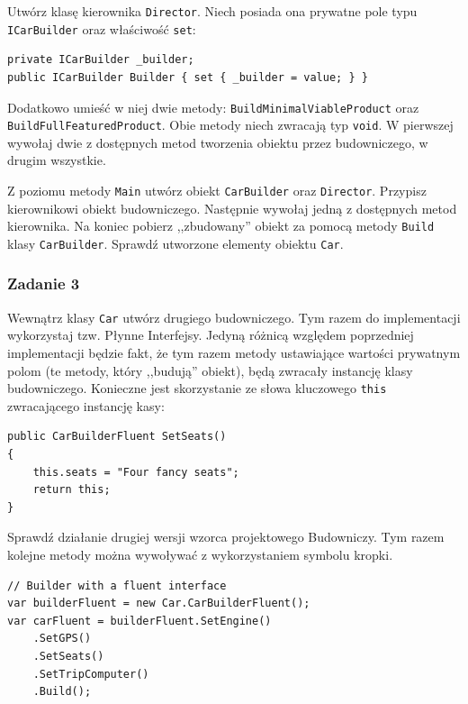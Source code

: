 Utwórz klasę kierownika \texttt{Director}. Niech posiada ona prywatne pole typu \texttt{ICarBuilder} oraz właściwość \texttt{set}:
\begin{lstlisting}
private ICarBuilder _builder;
public ICarBuilder Builder { set { _builder = value; } }
\end{lstlisting}
Dodatkowo umieść w niej dwie metody: \texttt{BuildMinimalViableProduct} oraz \texttt{BuildFullFeaturedProduct}. Obie metody niech zwracają typ \texttt{void}. W pierwszej wywołaj dwie z dostępnych metod tworzenia obiektu przez budowniczego, w drugim wszystkie.

Z poziomu metody \texttt{Main} utwórz obiekt \texttt{CarBuilder} oraz \texttt{Director}. Przypisz kierownikowi obiekt budowniczego. Następnie wywołaj jedną z dostępnych metod kierownika. Na koniec pobierz ,,zbudowany'' obiekt za pomocą metody \texttt{Build} klasy \texttt{CarBuilder}. Sprawdź utworzone elementy obiektu \texttt{Car}.

\subsubsection{Zadanie 3}
Wewnątrz klasy \texttt{Car} utwórz drugiego budowniczego. Tym razem do implementacji wykorzystaj tzw. Płynne Interfejsy. Jedyną różnicą względem poprzedniej implementacji będzie fakt, że tym razem metody ustawiające wartości prywatnym polom (te metody, który ,,budują'' obiekt), będą zwracały instancję klasy budowniczego. Konieczne jest skorzystanie ze słowa kluczowego \texttt{this} zwracającego instancję kasy:
\begin{lstlisting}
public CarBuilderFluent SetSeats()
{
	this.seats = "Four fancy seats";
	return this;
}
\end{lstlisting}

Sprawdź działanie drugiej wersji wzorca projektowego Budowniczy. Tym razem kolejne metody można wywoływać z wykorzystaniem symbolu kropki.
\begin{lstlisting}
// Builder with a fluent interface
var builderFluent = new Car.CarBuilderFluent();
var carFluent = builderFluent.SetEngine()
	.SetGPS()
	.SetSeats()
	.SetTripComputer()
	.Build();
\end{lstlisting}